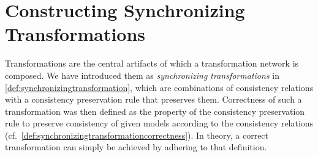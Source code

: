 \chapter{Constructing Synchronizing Transformations
}
\label{chap:synchronization}




Transformations are the central artifacts of which a transformation network is composed.
We have introduced them as \emph{synchronizing transformations} in \autoref{def:synchronizingtransformation}, which are combinations of consistency relations with a consistency preservation rule that preserves them.
Correctness of such a transformation was then defined as the property of the consistency preservation rule to preserve consistency of given models according to the consistency relations (cf.\ \autoref{def:synchronizingtransformationcorrectness}).
In theory, a correct transformation can simply be achieved by adhering to that definition.



